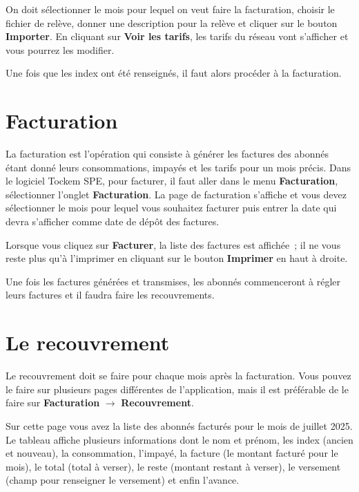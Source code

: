 On doit sélectionner le mois pour lequel on veut faire la facturation, choisir le fichier de relève, donner une description pour la relève et cliquer sur le bouton \textbf{Importer}. En cliquant sur \textbf{Voir les tarifs}, les tarifs du réseau vont s'afficher et vous pourrez les modifier.

Une fois que les index ont été renseignés, il faut alors procéder à la facturation.

\section{Facturation}

La facturation est l'opération qui consiste à générer les factures des abonnés étant donné leurs consommations, impayés et les tarifs pour un mois précis. Dans le logiciel Tockem SPE, pour facturer, il faut aller dans le menu \textbf{Facturation}, sélectionner l'onglet \textbf{Facturation}. La page de facturation s'affiche et vous devez sélectionner le mois pour lequel vous souhaitez facturer puis entrer la date qui devra s'afficher comme date de dépôt des factures.


Lorsque vous cliquez sur \textbf{Facturer}, la liste des factures est affichée~; il ne vous reste plus qu'à l'imprimer en cliquant sur le bouton \textbf{Imprimer} en haut à droite.


Une fois les factures générées et transmises, les abonnés commenceront à régler leurs factures et il faudra faire les recouvrements.

\section{Le recouvrement}
\label{sec:recouvrement}

Le recouvrement doit se faire pour chaque mois après la facturation. Vous pouvez le faire sur plusieurs pages différentes de l'application, mais il est préférable de le faire sur \textbf{Facturation} $\rightarrow$ \textbf{Recouvrement}.


Sur cette page vous avez la liste des abonnés facturés pour le mois de juillet 2025. Le tableau affiche plusieurs informations dont le nom et prénom, les index (ancien et nouveau), la consommation, l'impayé, la facture (le montant facturé pour le mois), le total (total à verser), le reste (montant restant à verser), le versement (champ pour renseigner le versement) et enfin l'avance.


